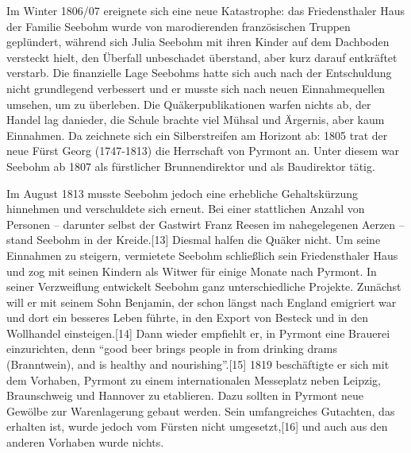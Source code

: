 \medskip

Im Winter 1806/07 ereignete sich eine neue Katastrophe: das Friedensthaler Haus
der Familie Seebohm wurde von marodierenden französischen Truppen geplündert,
während sich Julia Seebohm mit ihren Kinder auf dem Dachboden versteckt hielt,
den Überfall unbeschadet überstand, aber kurz darauf entkräftet verstarb. Die
finanzielle Lage Seebohms hatte sich auch nach der Entschuldung nicht
grundlegend verbessert und er musste sich nach neuen Einnahmequellen umsehen, um
zu überleben. Die Quäkerpublikationen warfen nichts ab, der Handel lag danieder,
die Schule brachte viel Mühsal und Ärgernis, aber kaum Einnahmen. Da zeichnete
sich ein Silberstreifen am Horizont ab: 1805 trat der neue Fürst Georg
(1747-1813) die Herrschaft von Pyrmont an. Unter diesem war Seebohm ab 1807 als
fürstlicher Brunnendirektor und als Baudirektor tätig.

\medskip

Im August 1813 musste Seebohm jedoch eine erhebliche Gehaltskürzung hinnehmen
und verschuldete sich erneut. Bei einer stattlichen Anzahl von Personen –
darunter selbst der Gastwirt Franz Reesen im nahegelegenen Aerzen – stand
Seebohm in der Kreide.[13] Diesmal halfen die Quäker nicht. Um seine Einnahmen
zu steigern, vermietete Seebohm schließlich sein Friedensthaler Haus und zog mit
seinen Kindern als Witwer für einige Monate nach Pyrmont. In seiner Verzweiflung
entwickelt Seebohm ganz unterschiedliche Projekte. Zunächst will er mit seinem
Sohn Benjamin, der schon längst nach England emigriert war und dort ein besseres
Leben führte, in den Export von Besteck und in den Wollhandel einsteigen.[14]
Dann wieder empfiehlt er, in Pyrmont eine Brauerei einzurichten, denn "`good
beer brings people in from drinking drams (Branntwein), and is healthy and
nourishing"'.[15] 1819 beschäftigte er sich mit dem Vorhaben, Pyrmont zu einem
internationalen Messeplatz neben Leipzig, Braunschweig und Hannover zu
etablieren. Dazu sollten in Pyrmont neue Gewölbe zur Warenlagerung gebaut
werden. Sein umfangreiches Gutachten, das erhalten ist, wurde jedoch vom Fürsten
nicht umgesetzt,[16] und auch aus den anderen Vorhaben wurde nichts.

\medskip

